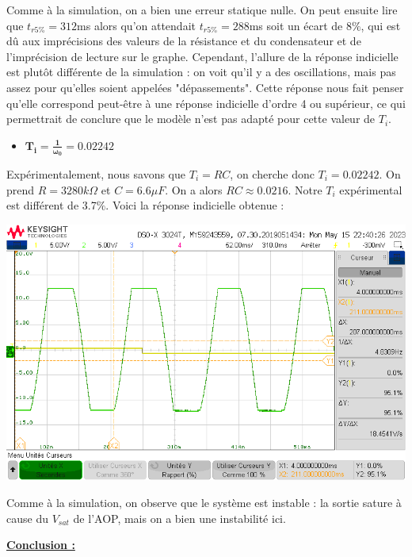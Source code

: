 \documentclass[12pt]{article}
\begin{document}
Comme à la simulation, on a bien une erreur statique nulle. On peut ensuite lire que $t_{r5\%} = 312$ms alors qu'on attendait $t_{r5\%} = 288$ms soit un écart de 8$\%$, qui est dû aux imprécisions des valeurs de la résistance et du condensateur et de l'imprécision de lecture sur le graphe.
Cependant, l'allure de la réponse indicielle est plutôt différente de la simulation : on voit qu'il y a des oscillations, mais pas assez pour qu'elles soient appelées "dépassements". Cette réponse nous fait penser qu'elle correspond peut-être à une réponse indicielle d'ordre 4 ou supérieur, ce qui permettrait de conclure que le modèle n'est pas adapté pour cette valeur de $T_i$.
\newpage\begin{itemize}
    \item \large $\mathbf{T_i = \frac{1}{\omega_0} = 0.02242}$
\end{itemize}
Expérimentalement, nous savons que $T_i = RC$, on cherche donc $T_i = 0.02242$. On prend $R = 3280 k\Omega$ et $C = 6.6 \mu F$. On a alors $RC \approx 0.0216$. Notre $T_i$ expérimental est différent de 3.7$\%$.
Voici la réponse indicielle obtenue : 
\begin{center}
    \includegraphics[width = 16 cm]{TP3/Syst_2/I/inst-syst2-ti=1surw0.png}
\end{center} 
Comme à la simulation, on observe que le système est instable : la sortie sature à cause du $V_{sat}$ de l'AOP, mais on a bien une instabilité ici.

\large \underline{\bf Conclusion : }
\normalsize
\end{document}
